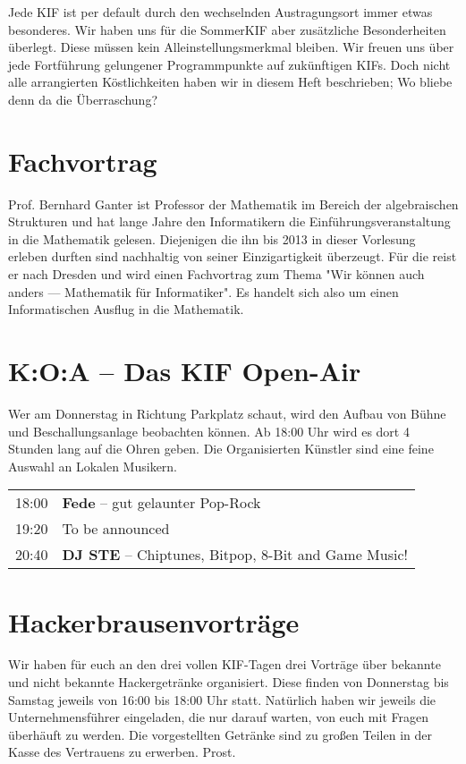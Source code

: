 
Jede KIF ist per default durch den wechselnden Austragungsort immer etwas besonderes.
Wir haben uns für die SommerKIF aber zusätzliche Besonderheiten überlegt.
Diese müssen kein Alleinstellungsmerkmal bleiben.
Wir freuen uns über jede Fortführung gelungener Programmpunkte auf zukünftigen KIFs.
Doch nicht alle arrangierten Köstlichkeiten haben wir in diesem Heft beschrieben; Wo bliebe denn da die Überraschung?

\section*{Fachvortrag}
Prof. Bernhard Ganter ist Professor der Mathematik im Bereich der algebraischen Strukturen und hat lange Jahre den Informatikern die Einführungsveranstaltung in die Mathematik gelesen.
Diejenigen die ihn bis 2013 in dieser Vorlesung erleben durften sind nachhaltig von seiner Einzigartigkeit überzeugt.
Für die \KIF{} reist er nach Dresden und wird einen Fachvortrag zum Thema "Wir können auch anders --- Mathematik für Informatiker".
Es handelt sich also um einen Informatischen Ausflug in die Mathematik.

\section*{K:O:A -- Das KIF Open-Air}
Wer am Donnerstag in Richtung Parkplatz schaut, wird den Aufbau von Bühne und Beschallungsanlage beobachten können.
Ab 18:00 Uhr wird es dort 4 Stunden lang auf die Ohren geben.
Die Organisierten Künstler sind eine feine Auswahl an Lokalen Musikern.
\vspace{10pt}

\begin{tabular}{rl}
    18:00 & \textbf{Fede} -- gut gelaunter Pop-Rock \\

    19:20 & To be announced\\

    20:40 & \textbf{DJ STE} -- Chiptunes, Bitpop, 8-Bit and Game Music!
\end{tabular}

\section*{Hackerbrausenvorträge}
Wir haben für euch an den drei vollen KIF-Tagen drei Vorträge über bekannte und nicht bekannte Hackergetränke organisiert.
Diese finden von Donnerstag bis Samstag jeweils von 16:00 bis 18:00 Uhr statt.
Natürlich haben wir jeweils die Unternehmensführer eingeladen, die nur darauf warten, von euch mit Fragen überhäuft zu werden.
Die vorgestellten Getränke sind zu großen Teilen in der Kasse des Vertrauens zu erwerben. Prost.

